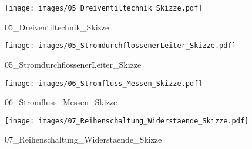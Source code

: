 %
%
\begin{figure}[!hb]%
    \centering
  \texttt{[image: images/05\_Dreiventiltechnik\_Skizze.pdf]}%
  \caption{05_Dreiventiltechnik_Skizze}%
\end{figure}

%
%
\begin{figure}[!hb]%
    \centering
  \texttt{[image: images/05\_StromdurchflossenerLeiter\_Skizze.pdf]}%
  \caption{05_StromdurchflossenerLeiter_Skizze}%
\end{figure}

%
%
\begin{figure}[!hb]%
    \centering
  \texttt{[image: images/06\_Stromfluss\_Messen\_Skizze.pdf]}%
  \caption{06_Stromfluss_Messen_Skizze}%
\end{figure}

%
%
\begin{figure}[!hb]%
    \centering
  \texttt{[image: images/07\_Reihenschaltung\_Widerstaende\_Skizze.pdf]}%
  \caption{07_Reihenschaltung_Widerstaende_Skizze}%
\end{figure}

